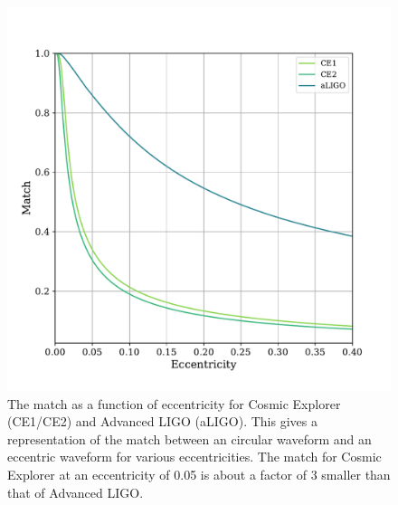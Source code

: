 \begin{figure}
    \includegraphics[width=1.1\columnwidth]{Figures/3G-bns-search-prospects/eccen-limit.pdf}
    \caption{The match as a function of eccentricity for Cosmic Explorer (CE1/CE2) and Advanced LIGO (aLIGO). This gives a representation of the match between an circular waveform and an eccentric waveform for various eccentricities. The match for Cosmic Explorer at an eccentricity of 0.05 is about a factor of 3 smaller than that of Advanced LIGO.}
\label{Fig:eccen-lim}
\end{figure}

